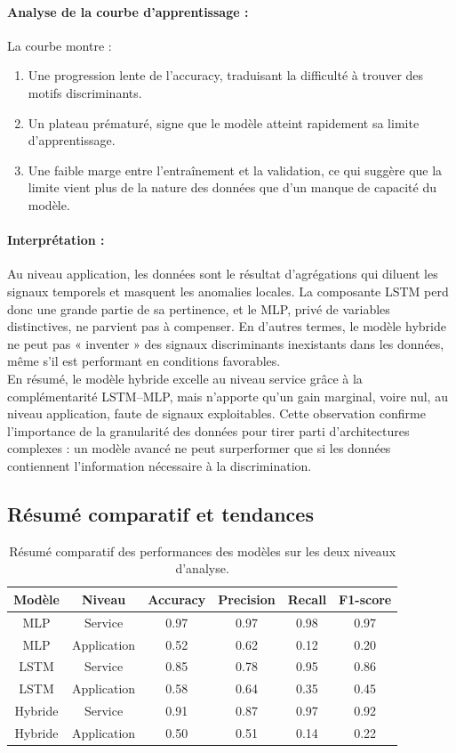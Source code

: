 \documentclass[a4paper,12pt]{report}
\begin{document}
\paragraph{Analyse de la courbe d’apprentissage :}
La courbe montre :
\begin{enumerate}
    \item Une progression lente de l’accuracy, traduisant la difficulté à trouver des motifs discriminants.
    \item Un plateau prématuré, signe que le modèle atteint rapidement sa limite d’apprentissage.
    \item Une faible marge entre l’entraînement et la validation, ce qui suggère que la limite vient plus de la nature des données que d’un manque de capacité du modèle.
\end{enumerate}

\paragraph{Interprétation :}
Au niveau application, les données sont le résultat d’agrégations qui diluent les signaux temporels et masquent les anomalies locales. La composante LSTM perd donc une grande partie de sa pertinence, et le MLP, privé de variables distinctives, ne parvient pas à compenser. En d’autres termes, le modèle hybride ne peut pas « inventer » des signaux discriminants inexistants dans les données, même s’il est performant en conditions favorables.\\

En résumé, le modèle hybride excelle au niveau service grâce à la complémentarité LSTM–MLP, mais n’apporte qu’un gain marginal, voire nul, au niveau application, faute de signaux exploitables. Cette observation confirme l’importance de la granularité des données pour tirer parti d’architectures complexes : un modèle avancé ne peut surperformer que si les données contiennent l’information nécessaire à la discrimination.


\subsection{Résumé comparatif et tendances}

\begin{table}[H]
\centering
\caption{Résumé comparatif des performances des modèles sur les deux niveaux d'analyse.}
\begin{tabular}{|c|c|c|c|c|c|}
\hline
\textbf{Modèle} & \textbf{Niveau} & \textbf{Accuracy} & \textbf{Precision} & \textbf{Recall} & \textbf{F1-score} \\
\hline
MLP & Service & 0.97 & 0.97 & 0.98 & 0.97 \\
MLP & Application & 0.52 & 0.62 & 0.12 & 0.20 \\
LSTM & Service & 0.85 & 0.78 & 0.95 & 0.86 \\
LSTM & Application & 0.58 & 0.64 & 0.35 & 0.45 \\
Hybride & Service & 0.91 & 0.87 & 0.97 & 0.92 \\
Hybride & Application & 0.50 & 0.51 & 0.14 & 0.22 \\
\hline
\end{tabular}
\end{table}
\end{document}
